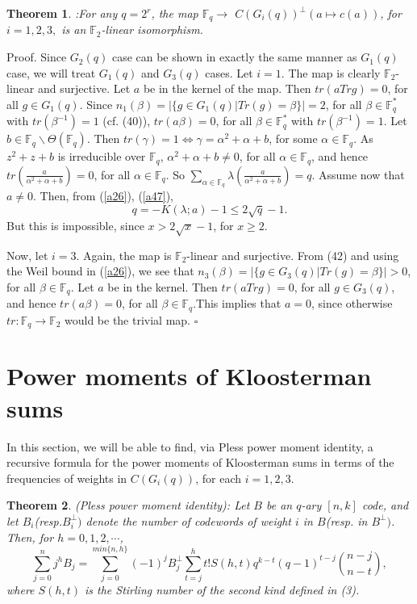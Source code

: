 \documentclass[a4,12pt]{elsart}
\newtheorem{theorem}{Theorem}
\begin{document}
\begin{theorem}:\label{M}
For any $q=2^r$, the map ${\mathbb{F}}_q \rightarrow $ $C(G_{i}(q))^{\bot}(a
\mapsto c(a))$, for $i=1,2,3,$ is an ${\mathbb{F}}_2$-linear isomorphism.
\end{theorem}

{{\sc Proof.} \enspace} Since $G_2(q)$ case can be shown in exactly the same manner
as $G_1(q)$ case, we will treat $G_1(q)$ and $G_3(q)$ cases. Let
$i=1$. The map is clearly ${\mathbb{F}}_2 $-linear and surjective. Let $a$ be
in the kernel of the map. Then $tr(a Tr g)=0$, for all $g \in
G_1(q)$. Since $n_1( \beta)=|\{g \in G_1(q )|Tr(g)= \beta \} |=2$,
for all $\beta \in {\mathbb{F}}_q^{*}$ with $tr( \beta^{-1})=1$ (cf. (40)),
$tr(a \beta)=0$, for all $\beta \in {\mathbb{F}}_q^{*}$ with $tr(\beta^{-1}
)=1$. Let $ b \in {\mathbb{F}}_q \backslash \Theta ({\mathbb{F}}_q)$. Then
$tr(\gamma)=1 \Leftrightarrow \gamma=\alpha^2+\alpha+b$, for some
$\alpha \in {\mathbb{F}}_q$. As $z^2+z+b$ is irreducible over ${\mathbb{F}}_q$,
$\alpha^2+ \alpha+b \neq 0$, for all $ \alpha \in {\mathbb{F}}_q$, and hence
$tr(\frac{a}{ \alpha^2 + \alpha+b})=0$, for all $ \alpha \in {\mathbb{F}}_q$.
So $\sum_{ \alpha \in {\mathbb{F}}_q } \lambda(\frac{ a}{\alpha^2 +
\alpha+b})=q$. Assume now that $a \neq 0 $. Then, from (\ref{a26}),
(\ref{a47}),
\[
q=-K( \lambda; a)-1 \leq 2 \sqrt{q}-1.
\]
But this is impossible, since $x > 2 \sqrt{x}-1 $, for $x \geq 2$.

Now, let $ i=3$. Again, the map is $ {\mathbb{F}}_2$-linear and surjective.
From (42) and using the Weil bound in (\ref{a26}), we see that $n_3(
\beta )=|\{g \in G_3(q)  |Tr(g)=\beta\} |>0$, for all $\beta \in
{\mathbb{F}}_q$. Let $a$ be in the kernel. Then $tr(aTr g)=0 $, for all $g
\in G_3 (q)$, and hence $tr(a \beta )=0$, for all $\beta \in
{\mathbb{F}}_q$.This implies that $a=0$, since otherwise $tr: {\mathbb{F}}_q
\rightarrow {\mathbb{F}}_2$ would be the trivial map.
\qquad \qquad \qquad \qquad \qquad \qquad \qquad \qquad \qquad $\square$\\

\section{Power moments of Kloosterman sums}
In this section, we will be able to find, via Pless power moment
identity, a recursive formula for the power moments of  Kloosterman
sums in terms of the frequencies of weights in $C(G_i(q))$, for each
$i=1,2,3$.

\begin{theorem}\label{N}(Pless power moment identity):
Let $ B$ be an $q$-ary $[n,k]$ code, and let $B_{i}$(resp.$B_{i}
^{\bot})$ denote the number of codewords of weight $i$ in $B$(resp.
in $B^{\bot})$. Then, for $h=0,1,2, \cdots$,
\begin{equation}\label{a48}
\sum_{j=0}^{n}j^{h}B_{j}=\sum_{j=0}^{min \{ n,h \}}(-1)^{j}B_{j}
^{\bot} \sum_{t=j}^{h} t! S(h,t)q^{k-t}(q-1)^{t-j}\binom{n-j}{n-t},
\end{equation}
where $S(h,t)$ is the Stirling number of the second kind defined in
(3).
\end{theorem}
\end{document}
